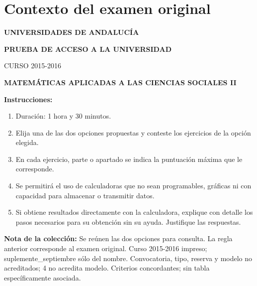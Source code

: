 \section*{Contexto del examen original}
\textbf{UNIVERSIDADES DE ANDALUCÍA}\par
\textbf{PRUEBA DE ACCESO A LA UNIVERSIDAD}\par
CURSO 2015-2016\par
\textbf{MATEMÁTICAS APLICADAS A LAS CIENCIAS SOCIALES II}

\textbf{Instrucciones:}
\begin{enumerate}[label=\textbf{\alph*)}]
  \item Duración: 1 hora y 30 minutos.
  \item Elija una de las dos opciones propuestas y conteste los ejercicios de la opción elegida.
  \item En cada ejercicio, parte o apartado se indica la puntuación máxima que le corresponde.
  \item Se permitirá el uso de calculadoras que no sean programables, gráficas ni con capacidad para almacenar o transmitir datos.
  \item Si obtiene resultados directamente con la calculadora, explique con detalle los pasos necesarios para su obtención sin su ayuda. Justifique las respuestas.
\end{enumerate}
\noindent\textbf{Nota de la colección:} Se reúnen las dos opciones para consulta. La regla anterior corresponde al examen original. Curso 2015-2016 impreso; suplemente\_septiembre sólo del nombre. Convocatoria, tipo, reserva y modelo no acreditados; 4 no acredita modelo. Criterios concordantes; sin tabla específicamente asociada.
\par\medskip

